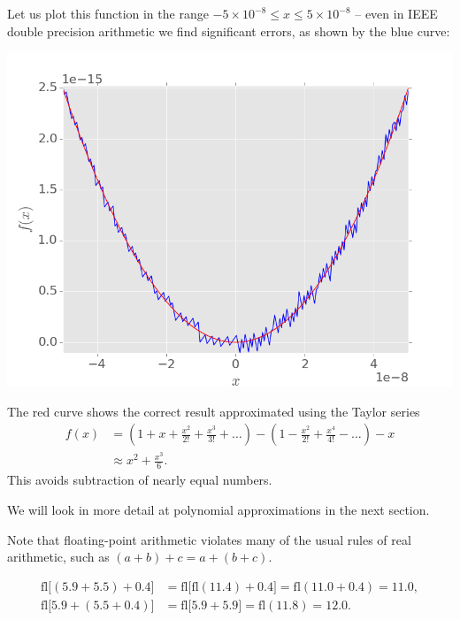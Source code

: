 \documentclass[
  letterpaper,
  DIV=11,
  numbers=noendperiod]{scrreprt}
\begin{document}
Let us plot this function in the range
\(-5\times 10^{-8}\leq x \leq 5\times 10^{-8}\) -- even in IEEE double
precision arithmetic we find significant errors, as shown by the blue
curve:

\begin{center}
\includegraphics[width=0.7\linewidth,height=\textheight,keepaspectratio]{im/floating1.png}
\end{center}

The red curve shows the correct result approximated using the Taylor
series \[
\begin{aligned}
f(x) &= \left(1 + x + \frac{x^2}{2!} + \frac{x^3}{3!} + \ldots\right) - \left( 1 - \frac{x^2}{2!} + \frac{x^4}{4!} - \ldots\right) - x\\
&\approx x^2 + \frac{x^3}{6}.
\end{aligned}
\] This avoids subtraction of nearly equal numbers.

\begin{tcolorbox}[enhanced jigsaw, arc=.35mm, toprule=.15mm, colframe=quarto-callout-note-color-frame, left=2mm, toptitle=1mm, titlerule=0mm, breakable, opacityback=0, bottomtitle=1mm, title=\textcolor{quarto-callout-note-color}{\faInfo}\hspace{0.5em}{Note}, rightrule=.15mm, opacitybacktitle=0.6, colbacktitle=quarto-callout-note-color!10!white, colback=white, leftrule=.75mm, bottomrule=.15mm, coltitle=black]

We will look in more detail at polynomial approximations in the next
section.

\end{tcolorbox}

Note that floating-point arithmetic violates many of the usual rules of
real arithmetic, such as \((a+b)+c = a + (b+c)\).

\[
\begin{aligned}
\mathrm{fl}\big[(5.9 + 5.5) + 0.4\big] &= \mathrm{fl}\big[\mathrm{fl}(11.4) + 0.4\big] = \mathrm{fl}(11.0 + 0.4) = 11.0,\\
\mathrm{fl}\big[5.9 + (5.5 + 0.4)\big] &= \mathrm{fl}\big[5.9 + 5.9 \big] = \mathrm{fl}(11.8) = 12.0.
\end{aligned}
\]
\end{document}
